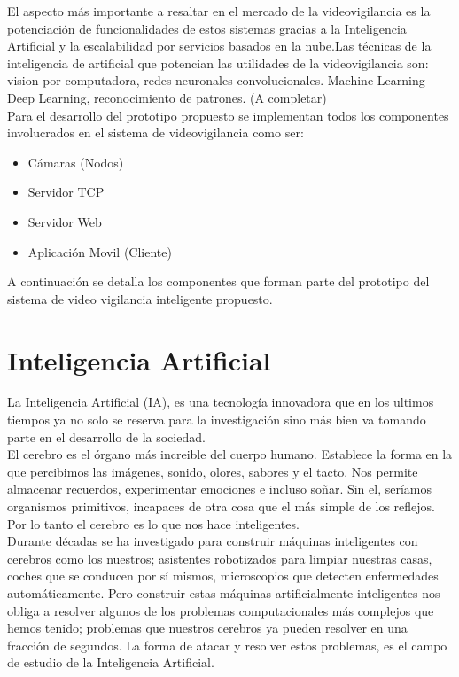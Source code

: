 El aspecto más importante a resaltar en el mercado de la videovigilancia es la potenciación de funcionalidades de estos sistemas gracias a la Inteligencia Artificial y la escalabilidad por servicios basados en la nube.Las técnicas de la inteligencia de artificial que potencian las utilidades de la videovigilancia son: vision por computadora, redes neuronales convolucionales. Machine Learning Deep Learning, reconocimiento de patrones. (A completar)\\

Para el desarrollo del prototipo propuesto se implementan todos los componentes involucrados en el sistema de videovigilancia como ser:
\begin{itemize}
    \item Cámaras (Nodos)
    \item Servidor TCP
    \item Servidor Web
    \item Aplicación Movil (Cliente)
\end{itemize}

A continuación se detalla los componentes que forman parte del prototipo del sistema de video vigilancia inteligente propuesto.

\section{Inteligencia Artificial}
La Inteligencia Artificial (IA), es una tecnología innovadora que en los ultimos tiempos ya no solo se reserva para la investigación sino más bien va tomando parte en el desarrollo de la sociedad.\\

El cerebro es el órgano más increible del cuerpo humano. Establece la forma en la que percibimos las imágenes, sonido, olores, sabores y el tacto. Nos permite almacenar recuerdos, experimentar emociones e incluso soñar. Sin el, seríamos organismos primitivos, incapaces de otra cosa que el más simple de los reflejos. Por lo tanto el cerebro es lo que nos hace inteligentes.\\

Durante décadas se ha investigado para construir máquinas inteligentes con cerebros como los nuestros; asistentes robotizados para limpiar nuestras casas, coches que se conducen por sí mismos, microscopios que detecten enfermedades automáticamente. Pero construir estas máquinas artificialmente inteligentes nos obliga a resolver algunos de los problemas computacionales más complejos que hemos tenido; problemas que nuestros cerebros ya pueden resolver en una fracción de segundos. La forma de atacar y resolver estos problemas, es el campo de estudio de la Inteligencia Artificial.

